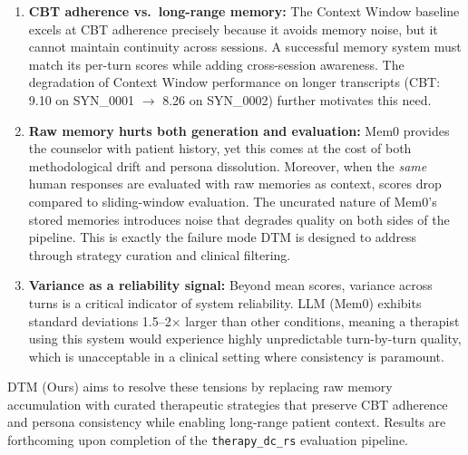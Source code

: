 \begin{enumerate}
    \item \textbf{CBT adherence vs.\ long-range memory:} The Context Window baseline excels at CBT adherence precisely because it avoids memory noise, but it cannot maintain continuity across sessions. A successful memory system must match its per-turn scores while adding cross-session awareness. The degradation of Context Window performance on longer transcripts (CBT: 9.10 on SYN\_0001 $\to$ 8.26 on SYN\_0002) further motivates this need.

    \item \textbf{Raw memory hurts both generation and evaluation:} Mem0 provides the counselor with patient history, yet this comes at the cost of both methodological drift and persona dissolution. Moreover, when the \emph{same} human responses are evaluated with raw memories as context, scores drop compared to sliding-window evaluation. The uncurated nature of Mem0's stored memories introduces noise that degrades quality on both sides of the pipeline. This is exactly the failure mode DTM is designed to address through strategy curation and clinical filtering.

    \item \textbf{Variance as a reliability signal:} Beyond mean scores, variance across turns is a critical indicator of system reliability. LLM (Mem0) exhibits standard deviations 1.5--2$\times$ larger than other conditions, meaning a therapist using this system would experience highly unpredictable turn-by-turn quality, which is unacceptable in a clinical setting where consistency is paramount.
\end{enumerate}

DTM (Ours) aims to resolve these tensions by replacing raw memory accumulation with curated therapeutic strategies that preserve CBT adherence and persona consistency while enabling long-range patient context. Results are forthcoming upon completion of the \texttt{therapy\_dc\_rs} evaluation pipeline.
